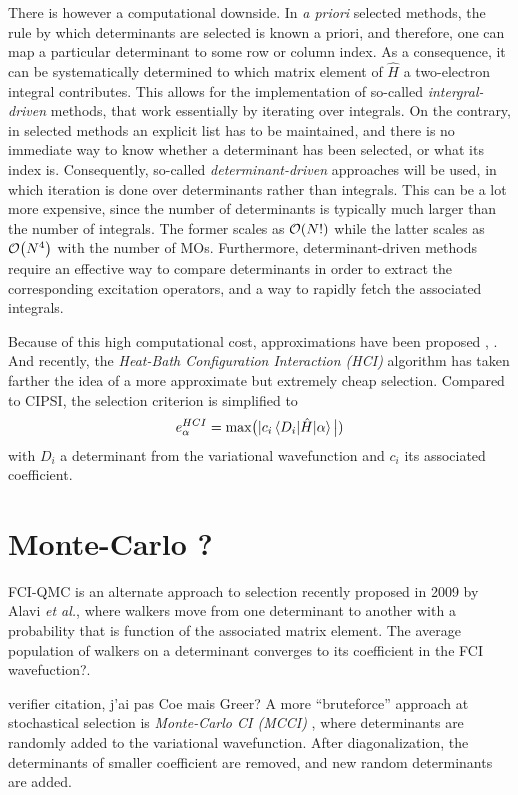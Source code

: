 \documentclass[./thesis.tex]{subfiles}
\begin{document}
There is however a computational downside. In \textit{a priori} selected methods, the rule by which determinants are selected is known a priori, and therefore, one can map a particular determinant to some row or column index.\cite{Knowles_1984} As a consequence, it can be systematically determined to which matrix element of $\widehat{H}$ a two-electron integral contributes. This allows for the implementation of so-called \emph{intergral-driven} methods, that work essentially by iterating over integrals.
On the contrary, in selected methods an explicit list has to be maintained, and there is no immediate way to know whether a determinant has been selected, or what its index is. Consequently, so-called \emph{determinant-driven} approaches will be used, in which iteration is done over determinants rather than integrals. This can be a lot more expensive, since the number of determinants is typically much larger than the number of integrals. The former scales as $\order{N!}$ while the latter scales as $\order{N^4}$ with the number of MOs.
Furthermore, determinant-driven methods require an effective way to compare determinants in order to extract the corresponding excitation operators, and a way to rapidly fetch the associated integrals.

Because of this high computational cost, approximations have been proposed \cite{Evangelisti_1983},  . And recently, the \emph{Heat-Bath Configuration Interaction (HCI)} algorithm has taken farther the idea of a more approximate but extremely cheap selection\cite{Holmes_2016, Sharma_2017}. Compared to CIPSI, the selection criterion is simplified to
\begin{equation}
e^{HCI}_\alpha = \text{max} \big  {(|} c_i \mel{D_i}{\hat{H}}{\alpha} \big {|)}
\end{equation}
with $D_i$ a determinant from the variational wavefunction and $c_i$ its associated coefficient.

\section{Monte-Carlo ?}
FCI-QMC is an alternate approach to selection recently proposed in 2009 by Alavi \textit{et al.}\cite{Booth_2009,Cleland_2010}, where walkers move from one determinant to another with a probability that is function of the associated matrix element. \alert{The average population of walkers on a determinant converges to its coefficient in the FCI wavefuction?}.

\alert{verifier citation, j'ai pas Coe mais Greer?} A more ``bruteforce'' approach at stochastical selection is \emph{Monte-Carlo CI (MCCI)} \cite{Greer_1995}, where determinants are randomly added to the variational wavefunction. After diagonalization, the determinants of smaller coefficient are removed, and new random determinants are added.
\end{document}
